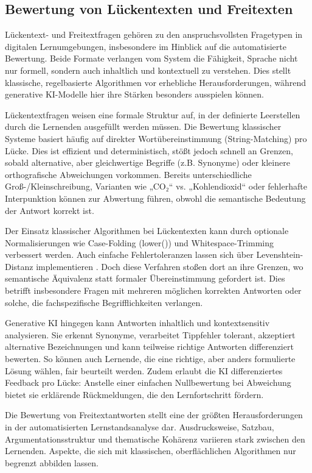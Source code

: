 \documentclass[a4paper,12pt]{article}
\begin{document}
\subsection{Bewertung von Lückentexten und Freitexten}
Lückentext- und Freitextfragen gehören zu den anspruchsvollsten Fragetypen in digitalen Lernumgebungen, insbesondere im Hinblick auf die automatisierte Bewertung. Beide Formate verlangen vom System die Fähigkeit, Sprache nicht nur formell, sondern auch inhaltlich und kontextuell zu verstehen. Dies stellt klassische, regelbasierte Algorithmen vor erhebliche Herausforderungen, während generative KI-Modelle hier ihre Stärken besonders ausspielen können.

Lückentextfragen weisen eine formale Struktur auf, in der definierte Leerstellen durch die Lernenden ausgefüllt werden müssen. Die Bewertung klassischer Systeme basiert häufig auf direkter Wortübereinstimmung (String-Matching) pro Lücke. Dies ist effizient und deterministisch, stößt jedoch schnell an Grenzen, sobald alternative, aber gleichwertige Begriffe (z.B. Synonyme) oder kleinere orthografische Abweichungen vorkommen. Bereits unterschiedliche Groß-/Kleinschreibung, Varianten wie „CO₂“ vs. „Kohlendioxid“ oder fehlerhafte Interpunktion können zur Abwertung führen, obwohl die semantische Bedeutung der Antwort korrekt ist.

Der Einsatz klassischer Algorithmen bei Lückentexten kann durch optionale Normalisierungen wie Case-Folding (lower()) und Whitespace-Trimming verbessert werden. Auch einfache Fehlertoleranzen lassen sich über Levenshtein-Distanz implementieren \parencite{jurafsky}. Doch diese Verfahren stoßen dort an ihre Grenzen, wo semantische Äquivalenz statt formaler Übereinstimmung gefordert ist. Dies betrifft insbesondere Fragen mit mehreren möglichen korrekten Antworten oder solche, die fachspezifische Begrifflichkeiten verlangen.

Generative KI hingegen kann Antworten inhaltlich und kontextsensitiv analysieren. Sie erkennt Synonyme, verarbeitet Tippfehler tolerant, akzeptiert alternative Bezeichnungen und kann teilweise richtige Antworten differenziert bewerten. So können auch Lernende, die eine richtige, aber anders formulierte Lösung wählen, fair beurteilt werden. Zudem erlaubt die KI differenziertes Feedback pro Lücke: Anstelle einer einfachen Nullbewertung bei Abweichung bietet sie erklärende Rückmeldungen, die den Lernfortschritt fördern.

Die Bewertung von Freitextantworten stellt eine der größten Herausforderungen in der automatisierten Lernstandsanalyse dar. Ausdrucksweise, Satzbau, Argumentationsstruktur und thematische Kohärenz variieren stark zwischen den Lernenden. Aspekte, die sich mit klassischen, oberflächlichen Algorithmen nur begrenzt abbilden lassen.
\end{document}
